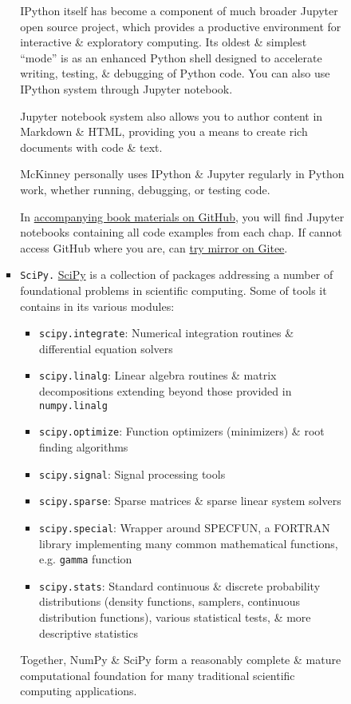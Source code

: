 \documentclass{article}
\begin{document}
\begin{enumerate}
\begin{itemize}
\begin{itemize}
\begin{itemize}
				IPython itself has become a component of much broader Jupyter open source project, which provides a productive environment for interactive \& exploratory computing. Its oldest \& simplest ``mode'' is as an enhanced Python shell designed to accelerate writing, testing, \& debugging of Python code. You can also use IPython system through Jupyter notebook.
				
				Jupyter notebook system also allows you to author content in Markdown \& HTML, providing you a means to create rich documents with code \& text.
				
				{\sc McKinney} personally uses IPython \& Jupyter regularly in Python work, whether running, debugging, or testing code.
				
				In \href{https://github.com/wesm/pydata-book}{accompanying book materials on GitHub}, you will find Jupyter notebooks containing all code examples from each chap. If cannot access GitHub where you are, can \href{https://gitee.com/wesmckinn/pydata-book}{try mirror on Gitee}.
				\item {\tt SciPy.} \href{https://scipy.org}{SciPy} is a collection of packages addressing a number of foundational problems in scientific computing. Some of tools it contains in its various modules:
				\begin{itemize}
					\item {\tt scipy.integrate}: Numerical integration routines \& differential equation solvers
					\item {\tt scipy.linalg}: Linear algebra routines \& matrix decompositions extending beyond those provided in {\tt numpy.linalg}
					\item {\tt scipy.optimize}: Function optimizers (minimizers) \& root finding algorithms
					\item {\tt scipy.signal}: Signal processing tools
					\item {\tt scipy.sparse}: Sparse matrices \& sparse linear system solvers
					\item {\tt scipy.special}: Wrapper around SPECFUN, a FORTRAN library implementing many common mathematical functions, e.g. {\tt gamma} function
					\item {\tt scipy.stats}: Standard continuous \& discrete probability distributions (density functions, samplers, continuous distribution functions), various statistical tests, \& more descriptive statistics
				\end{itemize}
				Together, NumPy \& SciPy form a reasonably complete \& mature computational foundation for many traditional scientific computing applications.

\end{itemize}
\end{itemize}
\end{itemize}
\end{enumerate}
\end{document}
